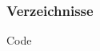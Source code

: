 \begin{frame}
    \frametitle{Verzeichnisse}
    \begin{block}{Code}
        
    \end{block}
\end{frame}
